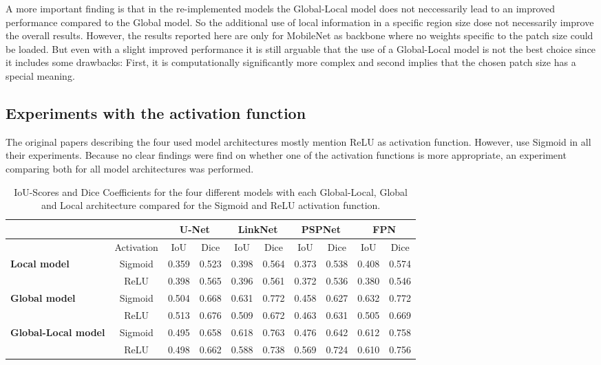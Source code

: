 A more important finding is that in the re-implemented models the Global-Local model does not neccessarily lead to an improved performance compared to the Global model. So the additional use of local information in a specific region size dose not necessarily improve the overall results. However, the results reported here are only for MobileNet as backbone where no weights specific to the patch size could be loaded. But even with a slight improved performance it is still arguable that the use of a Global-Local model is not the best choice since it includes some drawbacks: First, it is computationally significantly more complex and second implies that the chosen patch size has a special meaning.

\subsection{Experiments with the activation function}

The original papers describing the four used model architectures mostly mention ReLU as activation function. However, \citeauthor{Oota_2023_WACV} use Sigmoid in all their experiments. Because no clear findings were find on whether one of the activation functions is more appropriate, an experiment comparing both for all model architectures was performed.

\begin{table}[htb!]
	\centering
	\begin{tabular}{l | c ||c | c || c | c || c | c || c | c||}
	& & \multicolumn{2}{|c||}{U-Net} & \multicolumn{2}{|c||}{LinkNet} & \multicolumn{2}{|c||}{PSPNet} & \multicolumn{2}{|c||}{FPN} \\
	\hline
	& Activation & IoU & Dice & IoU & Dice & IoU & Dice & IoU & Dice \\
	\hline\hline
	\multirow{2}{*}{\textbf{Local model}} & Sigmoid & 0.359 & 0.523 & 0.398 & 0.564 & 0.373 & 0.538 & 0.408 & 0.574 \\
	& ReLU & 0.398 & 0.565 & 0.396 & 0.561 & 0.372 & 0.536 & 0.380 & 0.546 \\
	\hline
	\multirow{2}{*}{\textbf{Global model}} & Sigmoid & 0.504 & 0.668 & 0.631 & 0.772 & 0.458 & 0.627 & 0.632 & 0.772 \\
	& ReLU & 0.513 & 0.676 & 0.509 & 0.672 & 0.463 & 0.631 & 0.505 & 0.669 \\
	\hline
	\multirow{2}{*}{\textbf{Global-Local model}} & Sigmoid & 0.495 & 0.658 & 0.618 & 0.763 & 0.476 & 0.642 & 0.612 & 0.758\\
	& ReLU & 0.498 & 0.662 & 0.588 & 0.738 & 0.569 & 0.724 & 0.610 & 0.756 \\
	\end{tabular}
	\caption{IoU-Scores and Dice Coefficients for the four different models with each Global-Local, Global and Local architecture compared for the Sigmoid and ReLU activation function.}
	\label{table:sigmoid-relu-comparison}
\end{table}

